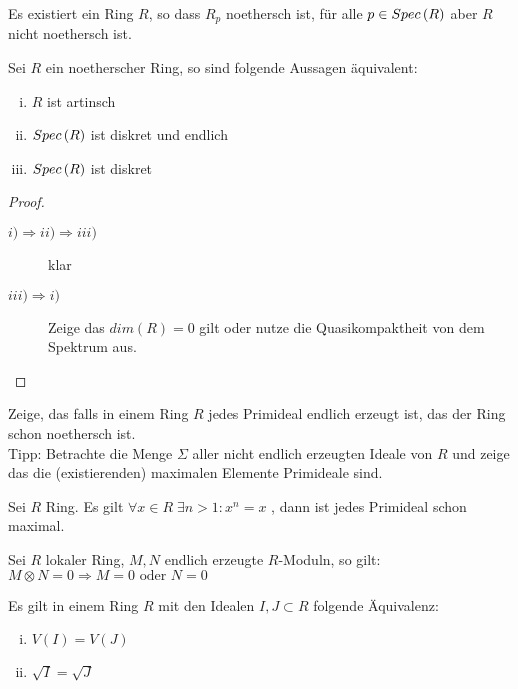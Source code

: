 \documentclass[ngerman, parskip=half, titlepage=false]{scrartcl}
\begin{document}
\begin{Beh}
  Es existiert ein Ring $R$, so dass $R_p$ noethersch ist, für alle $p \in Spec \left( R \right)$
  aber $R$ nicht noethersch ist.
\end{Beh}

\begin{Satz}
  Sei $R$ ein noetherscher Ring, so sind folgende Aussagen äquivalent:\\
  \begin{enumerate}[i)]
    \item $R$ ist artinsch
    \item $Spec \left( R \right)$ ist diskret und endlich
    \item $Spec \left( R \right)$ ist diskret
  \end{enumerate}
  \begin{proof}
    \begin{description}
      \item[$i) \Rightarrow ii) \Rightarrow iii)$] klar
      \item[$iii) \Rightarrow i)$] Zeige das $dim(R)=0$ gilt oder nutze
        die Quasikompaktheit von dem Spektrum aus.
    \end{description}
  \end{proof}
\end{Satz}

\begin{Satz}
  Zeige, das falls in einem Ring $R$ jedes Primideal endlich erzeugt ist,
  das der Ring schon noethersch ist.\\
  Tipp: Betrachte die Menge $\Sigma$ aller nicht endlich erzeugten Ideale von $R$
  und zeige das die (existierenden) maximalen Elemente Primideale sind.
\end{Satz}

\begin{Lem}
  Sei $R$ Ring. Es gilt $\forall x \in R \; \exists n > 1 : x^n = x$ , dann
  ist jedes Primideal schon maximal.
\end{Lem}

\begin{Beh}
  Sei $R$ lokaler Ring, $M,N$ endlich erzeugte $R$-Moduln, so gilt:\\
  $M \otimes N = 0 \Rightarrow M = 0 \text{ oder } N = 0$
\end{Beh}

\begin{Lem}
  Es gilt in einem Ring $R$ mit den Idealen $I,J \subset R$ folgende Äquivalenz:
  \begin{enumerate}[i)]
    \item $V(I)=V(J)$
    \item $\sqrt{I} = \sqrt{J}$
  \end{enumerate}
\end{Lem}
\end{document}

